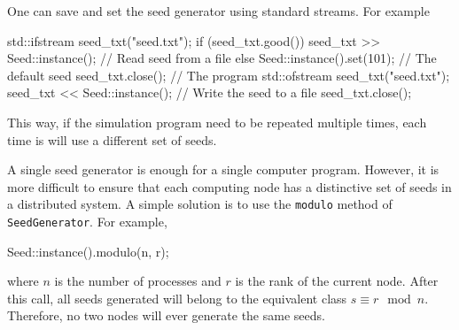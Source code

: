 One can save and set the seed generator using standard \cpp streams. For
example
\begin{cppcode}
  std::ifstream seed_txt("seed.txt");
  if (seed_txt.good())
      seed_txt >> Seed::instance(); // Read seed from a file
  else
      Seed::instance().set(101);    // The default seed
  seed_txt.close();
  // The program
  std::ofstream seed_txt("seed.txt");
  seed_txt << Seed::instance();     // Write the seed to a file
  seed_txt.close();
\end{cppcode}
This way, if the simulation program need to be repeated multiple times, each
time is will use a different set of seeds.

A single seed generator is enough for a single computer program. However, it is
more difficult to ensure that each computing node has a distinctive set of
seeds in a distributed system. A simple solution is to use the \verb|modulo|
method of \verb|SeedGenerator|. For example,
\begin{cppcode}
  Seed::instance().modulo(n, r);
\end{cppcode}
where $n$ is the number of processes and $r$ is the rank of the current node.
After this call, all seeds generated will belong to the equivalent class $s
\equiv r \mod n$. Therefore, no two nodes will ever generate the same seeds.
